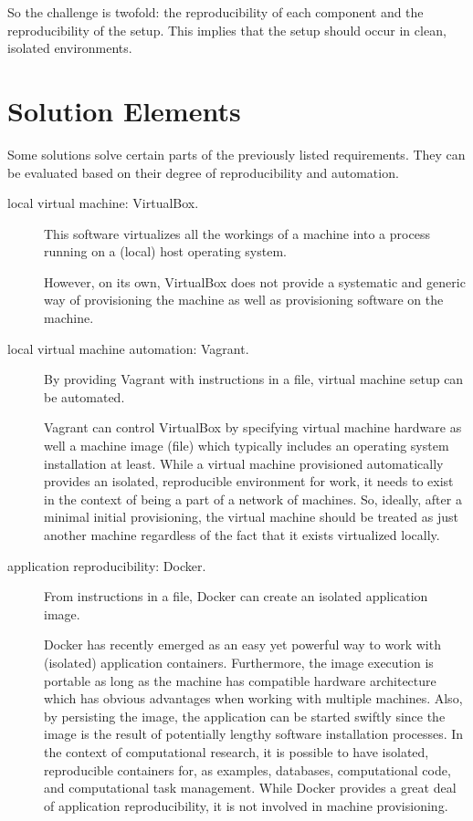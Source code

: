 So the challenge is twofold: the reproducibility of each component and the reproducibility of the setup.
%
This implies that the setup should occur in clean, isolated environments.


\section{Solution Elements}


Some solutions solve certain parts of the previously listed requirements.
%
They can be evaluated based on their degree of reproducibility and automation.


\begin{description}


\item[local virtual machine: \textsf{VirtualBox}.]
  This software virtualizes all the workings of a machine into a process running on a (local) host operating system.

  
  However, on its own, \textsf{VirtualBox} does not provide a systematic and generic way of provisioning the machine as well as provisioning software on the machine.


\item[local virtual machine automation: \textsf{Vagrant}.]
  By providing \textsf{Vagrant} with instructions in a file, virtual machine setup can be automated.
  

  \textsf{Vagrant} can control \textsf{VirtualBox} by specifying virtual machine hardware as well a machine image (file) which typically includes an operating system installation at least.
  While a virtual machine provisioned automatically provides an isolated, reproducible environment for work, it needs to exist in the context of being a part of a network of machines.
  So, ideally, after a minimal initial provisioning, the virtual machine should be treated as just another machine regardless of the fact that it exists virtualized locally.


\item[application reproducibility: \textsf{Docker}.]
  From instructions in a file, \textsf{Docker} can create an isolated application image.


  \textsf{Docker} has recently emerged as an easy yet powerful way to work with (isolated) application containers.
  Furthermore, the image execution is portable as long as the machine has compatible hardware architecture which has obvious advantages when working with multiple machines.
  Also, by persisting the image, the application can be started swiftly since the image is the result of potentially lengthy software installation processes.
%
  In the context of computational research, it is possible to have isolated, reproducible containers for, as examples, databases, computational code, and computational task management.
  While \textsf{Docker} provides a great deal of application reproducibility, it is not involved in machine provisioning.




\end{description}
